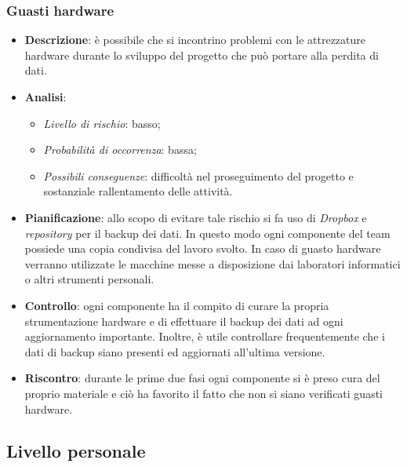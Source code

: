 		\subsubsection{Guasti hardware}
			\begin{itemize}
				\item \textbf{Descrizione}: è possibile che si incontrino problemi con le attrezzature hardware durante lo sviluppo del progetto che può portare alla perdita di dati.
				\item \textbf{Analisi}:
				\begin{itemize}
					\item \textit{Livello di rischio}: basso;
					\item \textit{Probabilità di occorrenza}: bassa;
					\item \textit{Possibili conseguenze}: difficoltà nel proseguimento del progetto e sostanziale rallentamento delle attività.
				\end{itemize}
				\item \textbf{Pianificazione}: allo scopo di evitare tale rischio si fa uso di \textit{Dropbox} e \textit{repository} per il backup dei dati. In questo modo ogni componente del team possiede una copia condivisa del lavoro svolto. In caso di guasto hardware verranno utilizzate le macchine messe a disposizione dai laboratori informatici o altri strumenti personali.
				\item \textbf{Controllo}: ogni componente ha il compito di curare la propria strumentazione hardware e di effettuare il backup dei dati ad ogni aggiornamento importante. Inoltre, è utile controllare frequentemente che i dati di backup siano presenti ed aggiornati all'ultima versione.
				\item \textbf{Riscontro}: durante le prime due fasi ogni componente si è preso cura del proprio materiale e ciò ha favorito il fatto che non si siano verificati guasti hardware.
			\end{itemize}
	\subsection{Livello personale}
